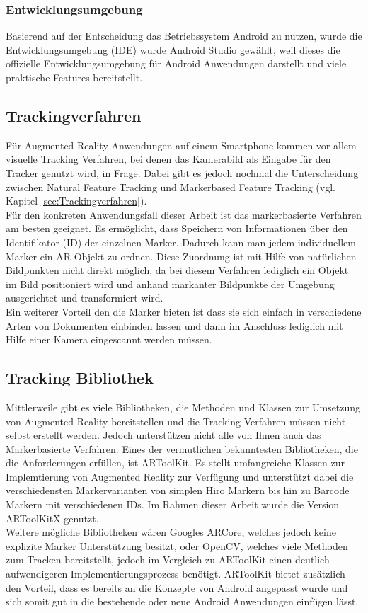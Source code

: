 \subsubsection{Entwicklungsumgebung}
Basierend auf der Entscheidung das Betriebssystem Android zu nutzen, wurde die Entwicklungsumgebung (IDE) wurde Android Studio gewählt, weil dieses die offizielle Entwicklungsumgebung für Android Anwendungen darstellt und viele praktische Features bereitstellt. 

\subsection{Trackingverfahren}
Für Augmented Reality Anwendungen auf einem Smartphone kommen vor allem visuelle Tracking Verfahren, bei denen das Kamerabild als Eingabe für den Tracker genutzt wird, in Frage. Dabei gibt es jedoch nochmal die Unterscheidung zwischen Natural Feature Tracking und Markerbased Feature Tracking (vgl. Kapitel \ref{sec:Trackingverfahren}). \\ 
Für den konkreten Anwendungsfall dieser Arbeit ist das markerbasierte Verfahren am besten geeignet. Es ermöglicht, dass Speichern von Informationen über den Identifikator (ID) der einzelnen Marker. Dadurch kann man jedem individuellem Marker ein AR-Objekt zu ordnen. Diese Zuordnung ist mit Hilfe von natürlichen Bildpunkten nicht direkt möglich, da bei diesem Verfahren lediglich ein Objekt im Bild positioniert wird und anhand markanter Bildpunkte der Umgebung ausgerichtet und transformiert wird. \\
Ein weiterer Vorteil den die Marker bieten ist dass sie sich einfach in verschiedene Arten von Dokumenten einbinden lassen und dann im Anschluss lediglich mit Hilfe einer Kamera eingescannt werden müssen. 

\subsection{Tracking Bibliothek}
Mittlerweile gibt es viele Bibliotheken, die Methoden und Klassen zur Umsetzung von Augmented Reality bereitstellen und die Tracking Verfahren müssen nicht selbst erstellt werden. Jedoch unterstützen nicht alle von Ihnen auch das Markerbasierte Verfahren. Eines der vermutlichen bekanntesten Bibliotheken, die die Anforderungen erfüllen, ist ARToolKit. Es stellt umfangreiche Klassen zur Implemtierung von Augmented Reality zur Verfügung und unterstützt dabei die verschiedensten Markervarianten von simplen Hiro Markern bis hin zu Barcode Markern mit verschiedenen IDs.
Im Rahmen dieser Arbeit wurde die Version ARToolKitX genutzt. \\
Weitere mögliche Bibliotheken wären Googles ARCore, welches jedoch keine explizite Marker Unterstützung besitzt, oder OpenCV, welches viele Methoden zum Tracken bereitstellt, jedoch im Vergleich zu ARToolKit einen deutlich aufwendigeren Implementierungsprozess benötigt. ARToolKit bietet zusätzlich den Vorteil, dass es bereits an die Konzepte von Android angepasst wurde und sich somit gut in die bestehende oder neue Android Anwendungen einfügen lässt.



